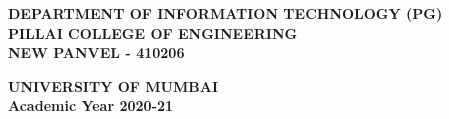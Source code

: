 \begin{titlepage}
{    {\bf
        DEPARTMENT OF INFORMATION TECHNOLOGY (PG) \\
        \vspace{0.2cm}
        \bf {PILLAI COLLEGE OF ENGINEERING}\\
        \bf NEW PANVEL - 410206
    } \\
    {\centering
    \hspace{.5cm}


    {\centering
        {\bf UNIVERSITY OF MUMBAI} \\
        \vspace{0.2cm}
    }
    {\centering
        {\bf Academic Year 2020-21}}
    }
    \\
}\end{titlepage}
